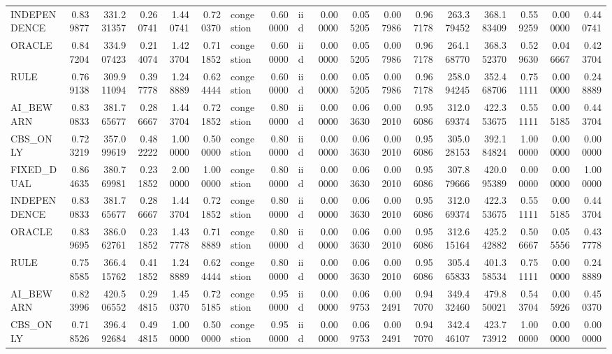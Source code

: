 \begin{tabular}{lrrrrrlrlrrrrrrrrr}
INDEPENDENCE & 0.839877 & 331.231357 & 0.260741 & 1.440741 & 0.720370 & congestion & 0.600000 & iid & 0.000000 & 0.055205 & 0.007986 & 0.967178 & 263.379452 & 368.183409 & 0.559259 & 0.000000 & 0.440741 \\
ORACLE & 0.847204 & 334.907423 & 0.214074 & 1.423704 & 0.711852 & congestion & 0.600000 & iid & 0.000000 & 0.055205 & 0.007986 & 0.967178 & 264.168770 & 368.352370 & 0.529630 & 0.046667 & 0.423704 \\
RULE & 0.769138 & 309.911094 & 0.397778 & 1.248889 & 0.624444 & congestion & 0.600000 & iid & 0.000000 & 0.055205 & 0.007986 & 0.967178 & 258.094245 & 352.468706 & 0.751111 & 0.000000 & 0.248889 \\
AI\_BEWARN & 0.830833 & 381.765677 & 0.286667 & 1.443704 & 0.721852 & congestion & 0.800000 & iid & 0.000000 & 0.063630 & 0.002010 & 0.956086 & 312.069374 & 422.353675 & 0.551111 & 0.005185 & 0.443704 \\
CBS\_ONLY & 0.723219 & 357.099619 & 0.482222 & 1.000000 & 0.500000 & congestion & 0.800000 & iid & 0.000000 & 0.063630 & 0.002010 & 0.956086 & 305.028153 & 392.184824 & 1.000000 & 0.000000 & 0.000000 \\
FIXED\_DUAL & 0.864635 & 380.769981 & 0.231852 & 2.000000 & 1.000000 & congestion & 0.800000 & iid & 0.000000 & 0.063630 & 0.002010 & 0.956086 & 307.879666 & 420.095389 & 0.000000 & 0.000000 & 1.000000 \\
INDEPENDENCE & 0.830833 & 381.765677 & 0.286667 & 1.443704 & 0.721852 & congestion & 0.800000 & iid & 0.000000 & 0.063630 & 0.002010 & 0.956086 & 312.069374 & 422.353675 & 0.551111 & 0.005185 & 0.443704 \\
ORACLE & 0.839695 & 386.062761 & 0.231852 & 1.437778 & 0.718889 & congestion & 0.800000 & iid & 0.000000 & 0.063630 & 0.002010 & 0.956086 & 312.615164 & 425.242882 & 0.506667 & 0.055556 & 0.437778 \\
RULE & 0.758585 & 366.415762 & 0.411852 & 1.248889 & 0.624444 & congestion & 0.800000 & iid & 0.000000 & 0.063630 & 0.002010 & 0.956086 & 305.465833 & 401.358534 & 0.751111 & 0.000000 & 0.248889 \\
AI\_BEWARN & 0.823996 & 420.506552 & 0.294815 & 1.450370 & 0.725185 & congestion & 0.950000 & iid & 0.000000 & 0.069753 & 0.002491 & 0.947070 & 349.432460 & 479.850021 & 0.543704 & 0.005926 & 0.450370 \\
CBS\_ONLY & 0.718526 & 396.492684 & 0.494815 & 1.000000 & 0.500000 & congestion & 0.950000 & iid & 0.000000 & 0.069753 & 0.002491 & 0.947070 & 342.446107 & 423.773912 & 1.000000 & 0.000000 & 0.000000 \\

\end{tabular}
